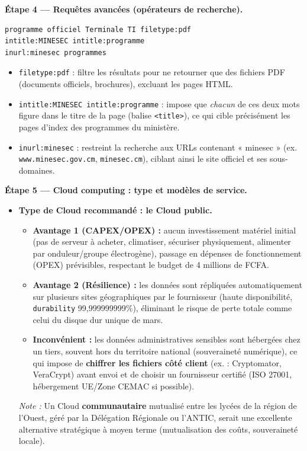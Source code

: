 \documentclass[11pt]{article}
\begin{document}
\begin{exoresolu}
\textbf{Étape 4 — Requêtes avancées (opérateurs de recherche).}

\begin{lstlisting}
programme officiel Terminale TI filetype:pdf
intitle:MINESEC intitle:programme
inurl:minesec programmes
\end{lstlisting}

\begin{itemize}
  \item \texttt{filetype:pdf} : filtre les résultats pour ne retourner que des fichiers PDF (documents officiels, brochures), excluant les pages HTML.
  \item \texttt{intitle:MINESEC intitle:programme} : impose que \emph{chacun} de ces deux mots figure dans le titre de la page (balise \texttt{<title>}), ce qui cible précisément les pages d'index des programmes du ministère.
  \item \texttt{inurl:minesec} : restreint la recherche aux URLs contenant « minesec » (ex. \texttt{www.minesec.gov.cm}, \texttt{minesec.cm}), ciblant ainsi le site officiel et ses sous-domaines.
\end{itemize}

\textbf{Étape 5 — Cloud computing : type et modèles de service.}

\begin{itemize}
  \item \textbf{Type de Cloud recommandé : le Cloud public.} 
    \begin{itemize}
      \item \textbf{Avantage 1 (CAPEX/OPEX) :} aucun investissement matériel initial (pas de serveur à acheter, climatiser, sécuriser physiquement, alimenter par onduleur/groupe électrogène), passage en dépenses de fonctionnement (OPEX) prévisibles, respectant le budget de 4 millions de FCFA.
      \item \textbf{Avantage 2 (Résilience) :} les données sont répliquées automatiquement sur plusieurs sites géographiques par le fournisseur (haute disponibilité, \texttt{durability} 99,999999999\%), éliminant le risque de perte totale comme celui du disque dur unique de mars.
      \item \textbf{Inconvénient :} les données administratives sensibles sont hébergées chez un tiers, souvent hors du territoire national (souveraineté numérique), ce qui impose de \textbf{chiffrer les fichiers côté client} (ex. : Cryptomator, VeraCrypt) avant envoi et de choisir un fournisseur certifié (ISO 27001, hébergement UE/Zone CEMAC si possible). 
    \end{itemize}
    \emph{Note :} Un Cloud \textbf{communautaire} mutualisé entre les lycées de la région de l'Ouest, géré par la Délégation Régionale ou l'ANTIC, serait une excellente alternative stratégique à moyen terme (mutualisation des coûts, souveraineté locale).
  

\end{itemize}
\end{exoresolu}
\end{document}
